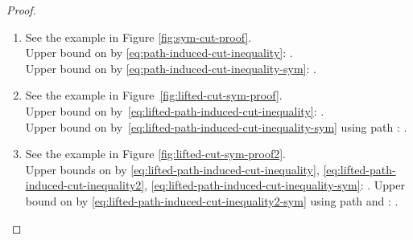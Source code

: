 \documentclass{article}
\begin{document}
\begin{proof}
\begin{enumerate}
    \item See the example in Figure \ref{fig:sym-cut-proof}.\\
    Upper bound  on  by \eqref{eq:path-induced-cut-inequality}:
    .\\
    Upper bound  on  by \eqref{eq:path-induced-cut-inequality-sym}: .
    
    \item See the example in Figure~\ref{fig:lifted-cut-sym-proof}.\\
    Upper bound  on  by~\eqref{eq:lifted-path-induced-cut-inequality}: 
    .\\
    Upper bound  on  by~\eqref{eq:lifted-path-induced-cut-inequality-sym} using path : .
    
    \item See the example in Figure \ref{fig:lifted-cut-sym-proof2}.\\
    Upper bounds  on  by \eqref{eq:lifted-path-induced-cut-inequality}, \eqref{eq:lifted-path-induced-cut-inequality2}, \eqref{eq:lifted-path-induced-cut-inequality-sym}: .
    Upper bound  on  by \eqref{eq:lifted-path-induced-cut-inequality2-sym} using path  and : .
\end{enumerate}

\end{proof}
\end{document}
